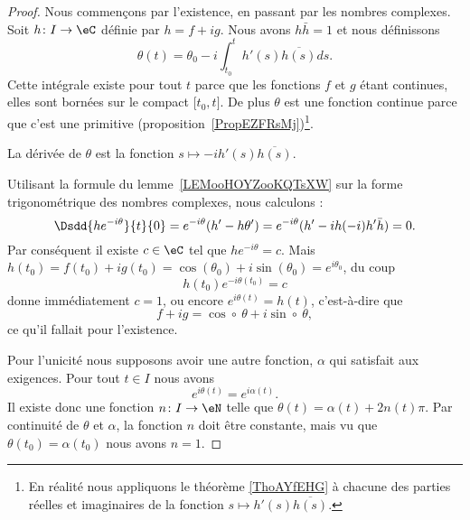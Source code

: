 \begin{proof}
	Nous commençons par l'existence, en passant par les nombres complexes. Soit \( h\colon I\to \eC\) définie par \( h=f+ig\). Nous avons \( h\bar h=1\) et nous définissons
	\begin{equation}
		\theta(t)=\theta_0-i\int_{t_0}^th'(s)\overline{ h(s) }ds.
	\end{equation}
	Cette intégrale existe pour tout \( t\) parce que les fonctions \( f\) et \( g\) étant continues, elles sont bornées sur le compact \( \mathopen[ t_0 , t  \mathclose]\). De plus \( \theta\) est une fonction continue parce que c'est une primitive (proposition~\ref{PropEZFRsMj})\footnote{En réalité nous appliquons le théorème \ref{ThoAYfEHG} à chacune des parties réelles et imaginaires de la fonction \( s\mapsto h'(s)\overline{ h(s) }\).}.

	La dérivée de \( \theta\) est la fonction \( s\mapsto -i h'(s)\overline{ h(s) }\).

	Utilisant la formule du lemme~\ref{LEMooHOYZooKQTsXW} sur la forme trigonométrique des nombres complexes, nous calculons :
	\begin{equation}
		\Dsdd{ h e^{-i\theta} }{t}{0}= e^{-i\theta}(h'-h\theta')= e^{-i\theta}(h'-ih(-i)h'\bar h)=0.
	\end{equation}
	Par conséquent il existe \( c\in \eC\) tel que \( h e^{-i\theta}=c\). Mais \( h(t_0)=f(t_0)+ig(t_0)=\cos(\theta_0)+i\sin(\theta_0)= e^{i\theta_0}\), du coup
	\begin{equation}
		h(t_0) e^{-i\theta(t_0)}=c
	\end{equation}
	donne immédiatement \( c=1\), ou encore \(  e^{i\theta(t)}=h(t)\), c'est-à-dire que
	\begin{equation}
		f+ig=\cos\circ\ \theta+i\sin\circ\ \theta,
	\end{equation}
	ce qu'il fallait pour l'existence.

	Pour l'unicité nous supposons avoir une autre fonction, \(\alpha\) qui satisfait aux exigences. Pour tout \( t\in I\) nous avons
	\begin{equation}
		e^{i\theta(t)}= e^{i\alpha(t)}.
	\end{equation}
	Il existe donc une fonction \( n\colon I\to \eN\) telle que \( \theta(t)=\alpha(t)+2n(t)\pi\). Par continuité de \( \theta\) et \( \alpha\), la fonction \( n\) doit être constante, mais vu que \( \theta(t_0)=\alpha(t_0)\) nous avons \( n=1\).
\end{proof}


